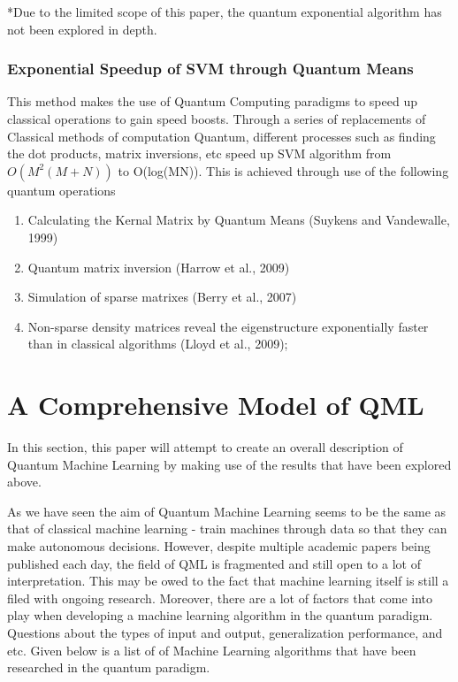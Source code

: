 \documentclass{article}
\begin{document}
*Due to the limited scope of this paper, the quantum exponential algorithm has not been explored in depth.

\subsubsection{Exponential Speedup of SVM through Quantum Means}
This method makes the use of Quantum Computing paradigms to speed up classical operations to gain speed boosts.  Through a series of replacements of Classical methods of computation Quantum, different processes such as finding  the  dot  products,  matrix  inversions,  etc  speed  up  SVM  algorithm from $O(M^2(M+N))$ to O(log(MN)).  This is achieved through use of the following quantum operations
\begin{enumerate}
    \item Calculating the Kernal Matrix by Quantum Means (Suykens and Vandewalle, 1999)
	\item Quantum matrix inversion (Harrow et al., 2009)
	\item Simulation of sparse matrixes (Berry et al., 2007)
    \item Non-sparse density matrices reveal the eigenstructure exponentially faster than in classical algorithms (Lloyd et al., 2009);
\end{enumerate}
\section{A Comprehensive Model of QML}
\par
In this section, this paper will attempt to create an overall description of Quantum Machine Learning by making use of the results that have been explored above.
\par
As we have seen the aim of Quantum Machine Learning seems to be the same as that of classical machine learning - train machines through data so that they can make autonomous decisions. However, despite multiple academic papers being published each day, the field of QML is fragmented and still open to a lot of interpretation. \cite{BOOK:1} This may be owed to the fact that machine learning itself is still a filed with ongoing research. Moreover, there are a lot of factors that come into play when developing a machine learning algorithm in the quantum paradigm. Questions about the types of input and output, generalization performance, and etc. Given below is a list of of Machine Learning algorithms that have been researched in the quantum paradigm. 
\end{document}
